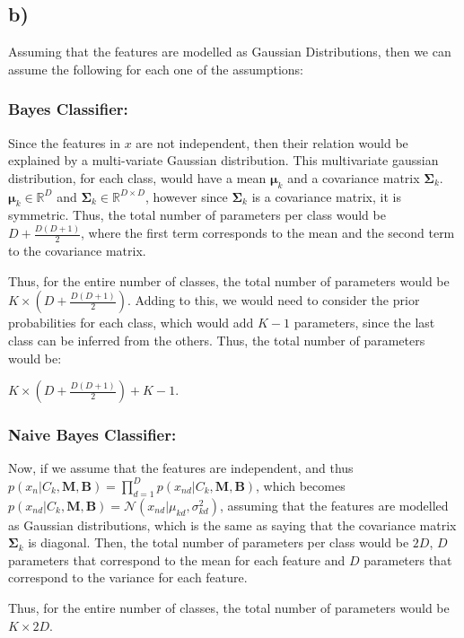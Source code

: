 \documentclass[12pt,a4paper,oneside]{paper}
\begin{document}
\subsection*{b)}

Assuming that the features are modelled as Gaussian Distributions, then we can assume the following for each
one of the assumptions: 

\subsubsection*{Bayes Classifier:}

Since the features in $x$ are not independent, then their relation would be explained by a multi-variate Gaussian distribution.
This multivariate gaussian distribution, for each class, would have a mean $\bm{\mu}_k$ and a covariance matrix $\bm{\Sigma}_k$.
$\bm{\mu}_k \in \mathbb{R}^{D}$ and $\bm{\Sigma}_k \in \mathbb{R}^{D \times D}$, however since $\bm{\Sigma}_k$ is a covariance matrix, it is symmetric.
Thus, the total number of parameters per class would be $D + \frac{D(D+1)}{2}$, where the first term corresponds to the mean and the second term to the covariance matrix.

Thus, for the entire number of classes, the total number of parameters would be $K \times (D + \frac{D(D+1)}{2})$.
Adding to this, we would need to consider the prior probabilities for each class, which would add $K - 1$ parameters, since the last class can be inferred from the others.
Thus, the total number of parameters would be:

$K \times (D + \frac{D(D+1)}{2}) + K - 1$.

\subsubsection*{Naive Bayes Classifier:}

Now, if we assume that the features are independent, and thus $p(x_n | C_k, \bm{M}, \bm{B}) = \prod_{d=1}^{D} p(x_{nd} | C_k, \bm{M}, \bm{B})$,
which becomes $p(x_{nd} | C_k, \bm{M}, \bm{B}) = \mathcal{N}(x_{nd} | \mu_{kd}, \sigma_{kd}^2)$, assuming that the features are modelled as Gaussian distributions, which is
the same as saying that the covariance matrix $\bm{\Sigma}_k$ is diagonal.
Then, the total number of parameters per class would be $2D$, $D$ parameters that correspond to the mean for each feature and $D$ parameters that correspond to the variance for each feature.

Thus, for the entire number of classes, the total number of parameters would be $K \times 2D$.
\end{document}
